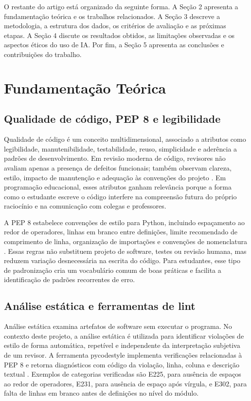 \documentclass[12pt]{article}
\begin{document}
O restante do artigo está organizado da seguinte forma. A Seção 2 apresenta a
fundamentação teórica e os trabalhos relacionados. A Seção 3 descreve a
metodologia, a estrutura dos dados, os critérios de avaliação e as próximas
etapas. A Seção 4 discute os resultados obtidos, as limitações observadas e os
aspectos éticos do uso de IA. Por fim, a Seção 5 apresenta as conclusões e
contribuições do trabalho.

\section{Fundamentação Teórica}

\subsection{Qualidade de código, PEP 8 e legibilidade}

Qualidade de código é um conceito multidimensional, associado a atributos como
legibilidade, manutenibilidade, testabilidade, reuso, simplicidade e aderência a
padrões de desenvolvimento. Em revisão moderna de código, revisores não avaliam
apenas a presença de defeitos funcionais; também observam clareza, estilo,
impacto de manutenção e adequação às convenções do projeto
\cite{bacchelli2013modernreview}. Em programação educacional, esses atributos
ganham relevância porque a forma como o estudante escreve o código interfere na
compreensão futura do próprio raciocínio e na comunicação com colegas e
professores.

A PEP 8 estabelece convenções de estilo para Python, incluindo espaçamento ao
redor de operadores, linhas em branco entre definições, limite recomendado de
comprimento de linha, organização de importações e convenções de nomenclatura
\cite{vanrossum2001pep8}. Essas regras não substituem projeto de software,
testes ou revisão humana, mas reduzem variação desnecessária na escrita do
código. Para estudantes, esse tipo de padronização cria um vocabulário comum de
boas práticas e facilita a identificação de padrões recorrentes de erro.

\subsection{Análise estática e ferramentas de lint}

Análise estática examina artefatos de software sem executar o programa. No
contexto deste projeto, a análise estática é utilizada para identificar
violações de estilo de forma automática, repetível e independente da
interpretação subjetiva de um revisor. A ferramenta pycodestyle
implementa verificações relacionadas à PEP 8 e retorna diagnósticos com código
da violação, linha, coluna e descrição textual \cite{pycqa2026pycodestyle}.
Exemplos de categorias verificadas são E225, para ausência de espaços ao redor
de operadores, E231, para ausência de espaço após vírgula, e E302, para falta
de linhas em branco antes de definições no nível do módulo.
\end{document}
